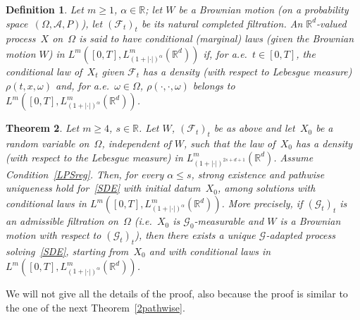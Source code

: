 \documentclass[a4paper,10pt]{article}
\newtheorem{theorem}{Theorem}[section]
\newtheorem{definition}[theorem]{Definition}
\newcommand\1{\mathbbm{1}}
\newcommand{\mr}{\mathbb{R}}
\newcommand{\mc}{\mathcal}
\numberwithin{equation}{section}
\begin{document}
\begin{definition}\label{1defpathw}
Let $m \geq 1$, $\alpha\in\mr$; let $W$ be a Brownian motion \textup{(}on a probability space~$(\Omega,\mc{A},P)$\textup{)}, let $(\mc{F}_t)_t$ be its natural completed filtration. An $\mr^d$-valued process~$X$ on~$\Omega$ is said to have \emph{conditional \textup{(}marginal\textup{)} laws} \textup{(}given the Brownian motion $W$\textup{)} \emph{in $L^m([0,T],L^m_{(1+|\cdot|)^{\alpha}}(\mr^d))$} if, for a.e.~$t \in [0,T]$, the conditional law of~$X_t$ given $\mc{F}_t$ has a density \textup{(}with respect to Lebesgue measure\textup{)} $\rho(t,x,\omega)$ and, for a.e.~$\omega \in \Omega$, $\rho(\cdot,\cdot,\omega)$ belongs to $L^m([0,T],L^m_{(1+|\cdot|)^{\alpha}}(\mr^d))$.
\end{definition}

\begin{theorem}\label{1pathuniq}
Let $m\ge4$, $s\in\mr$. Let $W$, $(\mc{F}_t)_t$ be as above and let~$X_0$ be a random variable on~$\Omega$, independent of $W$, such that the law of~$X_0$ has a density \textup{(}with respect to the Lebesgue measure\textup{)} in $L^m_{(1+|\cdot|)^{2s+d+1}}(\mr^d)$. Assume Condition~\ref{LPSreg}. Then, for every $\alpha\le s$, strong existence and pathwise uniqueness hold for~\eqref{SDE} with initial datum~$X_0$, among solutions with conditional laws in $L^m([0,T],L^m_{(1+|\cdot|)^{\alpha}}(\mr^d))$. More precisely, if $(\mc{G}_t)_t$ is an admissible filtration on~$\Omega$ \textup{(}i.e.~$X_0$ is $\mc{G}_0$-measurable and $W$ is a Brownian motion with respect to $(\mc{G}_t)_t$\textup{)}, then there exists a unique $\mc{G}$-adapted process solving~\eqref{SDE}, starting from~$X_0$ and with conditional laws in $L^m([0,T],L^m_{(1+|\cdot|)^{\alpha}}(\mr^d))$.
\end{theorem}

We will not give all the details of the proof, also because the proof is similar to the one of the next Theorem~\ref{2pathwise}.
\end{document}
